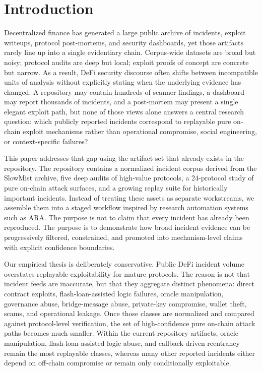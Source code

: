 \section{Introduction}
\label{sec:introduction}

Decentralized finance has generated a large public archive of incidents, exploit writeups, protocol post-mortems, and security dashboards, yet those artifacts rarely line up into a single evidentiary chain. Corpus-wide datasets are broad but noisy; protocol audits are deep but local; exploit proofs of concept are concrete but narrow. As a result, DeFi security discourse often shifts between incompatible units of analysis without explicitly stating when the underlying evidence has changed. A repository may contain hundreds of scanner findings, a dashboard may report thousands of incidents, and a post-mortem may present a single elegant exploit path, but none of those views alone answers a central research question: which publicly reported incidents correspond to replayable pure on-chain exploit mechanisms rather than operational compromise, social engineering, or context-specific failures?

This paper addresses that gap using the artifact set that already exists in the repository. The repository contains a normalized incident corpus derived from the SlowMist archive, five deep audits of high-value protocols, a 24-protocol study of pure on-chain attack surfaces, and a growing replay suite for historically important incidents. Instead of treating these assets as separate workstreams, we assemble them into a staged workflow inspired by research automation systems such as ARA. The purpose is not to claim that every incident has already been reproduced. The purpose is to demonstrate how broad incident evidence can be progressively filtered, constrained, and promoted into mechanism-level claims with explicit confidence boundaries.

Our empirical thesis is deliberately conservative. Public DeFi incident volume overstates replayable exploitability for mature protocols. The reason is not that incident feeds are inaccurate, but that they aggregate distinct phenomena: direct contract exploits, flash-loan-assisted logic failures, oracle manipulation, governance abuse, bridge-message abuse, private-key compromise, wallet theft, scams, and operational leakage. Once those classes are normalized and compared against protocol-level verification, the set of high-confidence pure on-chain attack paths becomes much smaller. Within the current repository artifacts, oracle manipulation, flash-loan-assisted logic abuse, and callback-driven reentrancy remain the most replayable classes, whereas many other reported incidents either depend on off-chain compromise or remain only conditionally exploitable.

